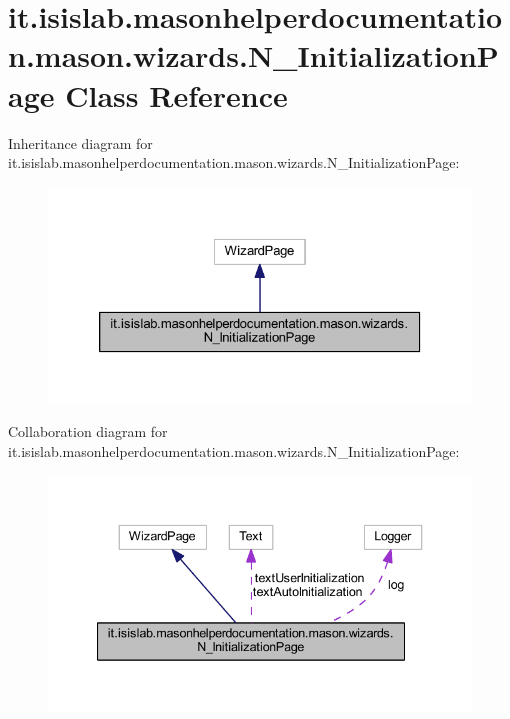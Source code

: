\hypertarget{classit_1_1isislab_1_1masonhelperdocumentation_1_1mason_1_1wizards_1_1_n___initialization_page}{\section{it.\-isislab.\-masonhelperdocumentation.\-mason.\-wizards.\-N\-\_\-\-Initialization\-Page Class Reference}
\label{classit_1_1isislab_1_1masonhelperdocumentation_1_1mason_1_1wizards_1_1_n___initialization_page}
}


Inheritance diagram for it.\-isislab.\-masonhelperdocumentation.\-mason.\-wizards.\-N\-\_\-\-Initialization\-Page\-:
\nopagebreak
\begin{figure}[H]
\begin{center}
\leavevmode
\includegraphics[width=326pt]{classit_1_1isislab_1_1masonhelperdocumentation_1_1mason_1_1wizards_1_1_n___initialization_page__inherit__graph}
\end{center}
\end{figure}


Collaboration diagram for it.\-isislab.\-masonhelperdocumentation.\-mason.\-wizards.\-N\-\_\-\-Initialization\-Page\-:
\nopagebreak
\begin{figure}[H]
\begin{center}
\leavevmode
\includegraphics[width=340pt]{classit_1_1isislab_1_1masonhelperdocumentation_1_1mason_1_1wizards_1_1_n___initialization_page__coll__graph}
\end{center}
\end{figure}
